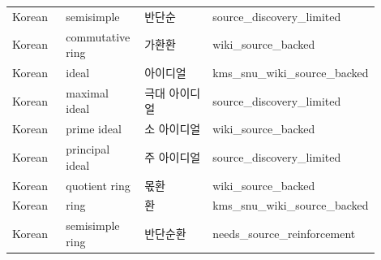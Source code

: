 \documentclass{article}
\begin{document}
\begin{longtable}{p{0.16\linewidth}p{0.22\linewidth}p{0.28\linewidth}p{0.24\linewidth}}
Korean & semisimple & 반단순 & source\_discovery\_limited \\
Korean & commutative ring & 가환환 & wiki\_source\_backed \\
Korean & ideal & 아이디얼 & kms\_snu\_wiki\_source\_backed \\
Korean & maximal ideal & 극대 아이디얼 & source\_discovery\_limited \\
Korean & prime ideal & 소 아이디얼 & wiki\_source\_backed \\
Korean & principal ideal & 주 아이디얼 & source\_discovery\_limited \\
Korean & quotient ring & 몫환 & wiki\_source\_backed \\
Korean & ring & 환 & kms\_snu\_wiki\_source\_backed \\
Korean & semisimple ring & 반단순환 & needs\_source\_reinforcement \\
\end{longtable}
\end{document}
